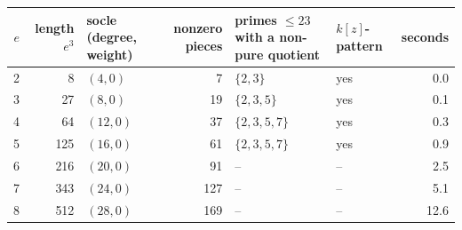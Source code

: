 \begin{tabular}{@{}rrlr>{\raggedright\arraybackslash}p{3.1cm}lr@{}}
\toprule
$e$ & length $e^3$ & socle (degree, weight) & nonzero pieces & primes $\le23$ with a non-pure quotient & $k[z]$-pattern & seconds\\
\midrule
2 & 8 & $(4,0)$ & 7 & $\{2,3\}$ & yes & 0.0\\
3 & 27 & $(8,0)$ & 19 & $\{2,3,5\}$ & yes & 0.1\\
4 & 64 & $(12,0)$ & 37 & $\{2,3,5,7\}$ & yes & 0.3\\
5 & 125 & $(16,0)$ & 61 & $\{2,3,5,7\}$ & yes & 0.9\\
6 & 216 & $(20,0)$ & 91 & -- & -- & 2.5\\
7 & 343 & $(24,0)$ & 127 & -- & -- & 5.1\\
8 & 512 & $(28,0)$ & 169 & -- & -- & 12.6\\
\bottomrule
\end{tabular}
